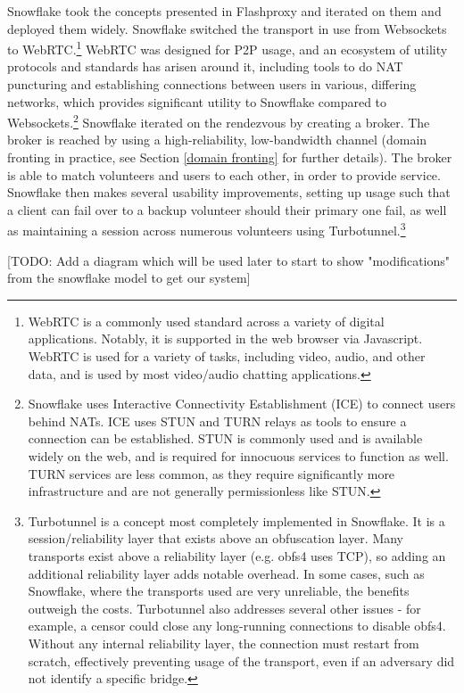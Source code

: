 \documentclass[12pt]{report}
\begin{document}
Snowflake took the concepts presented in Flashproxy and iterated on them and deployed them widely. Snowflake switched the transport in use from Websockets to WebRTC.\footnote{WebRTC is a commonly used standard across a variety of digital applications. Notably, it is supported in the web browser via Javascript. WebRTC is used for a variety of tasks, including video, audio, and other data, and is used by most video/audio chatting applications.} WebRTC was designed for P2P usage, and an ecosystem of utility protocols and standards has arisen around it, including tools to do NAT puncturing and establishing connections between users in various, differing networks, which provides significant utility to Snowflake compared to Websockets.\footnote{Snowflake uses Interactive Connectivity Establishment (ICE) to connect users behind NATs. ICE uses STUN and TURN relays as tools to ensure a connection can be established. STUN is commonly used and is available widely on the web, and is required for innocuous services to function as well. TURN services are less common, as they require significantly more infrastructure and are not generally permissionless like STUN.\cite{snowflake}} Snowflake iterated on the rendezvous by creating a broker. The broker is reached by using a high-reliability, low-bandwidth channel (domain fronting in practice, see Section \ref{domain fronting} for further details). The broker is able to match volunteers and users to each other, in order to provide service. Snowflake then makes several usability improvements, setting up usage such that a client can fail over to a backup volunteer should their primary one fail, as well as maintaining a session across numerous volunteers using Turbotunnel.\footnote{Turbotunnel is a concept most completely implemented in Snowflake. It is a session/reliability layer that exists above an obfuscation layer.\cite{turbotunnel} Many transports exist above a reliability layer (e.g. obfs4 uses TCP), so adding an additional reliability layer adds notable overhead. In some cases, such as Snowflake, where the transports used are very unreliable, the benefits outweigh the costs. Turbotunnel also addresses several other issues - for example, a censor could close any long-running connections to disable obfs4.\cite{turbotunnel} Without any internal reliability layer, the connection must restart from scratch, effectively preventing usage of the transport, even if an adversary did not identify a specific bridge.}

[TODO: Add a diagram which will be used later to start to show "modifications" from the snowflake model to get our system]
\end{document}
